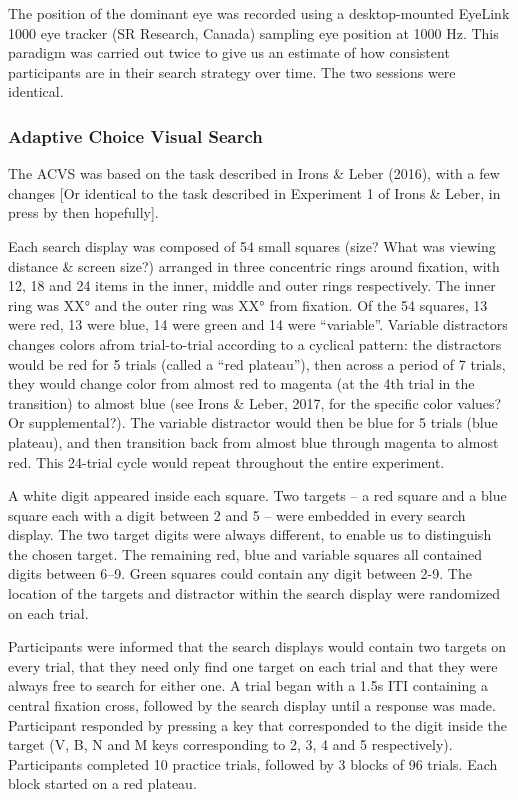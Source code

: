 \documentclass[]{rsos}%
\begin{document}
The position of the dominant eye was recorded using a desktop-mounted EyeLink 1000 eye
tracker (SR Research, Canada) sampling eye position at 1000 Hz.
This paradigm was carried out twice to give us an estimate of how consistent participants are in their search strategy over time. The two sessions were identical.

\subsubsection{Adaptive Choice Visual Search}

The ACVS was based on the task described in Irons & Leber (2016), with a few changes [Or identical to the task described in Experiment 1 of Irons & Leber, in press by then hopefully].

Each search display was composed of 54 small squares (size? What was viewing distance & screen size?) arranged in three concentric rings around fixation, with 12, 18 and 24 items in the inner, middle and outer rings respectively. The inner ring was XX° and the outer ring was XX° from fixation. Of the 54 squares, 13 were red, 13 were blue, 14 were green and 14 were “variable”. Variable distractors changes colors afrom trial-to-trial according to a cyclical pattern: the distractors would be red for 5 trials (called a “red plateau”), then across a period of 7 trials, they would change color from almost red to magenta (at the 4th trial in the transition) to almost blue (see Irons & Leber, 2017, for the specific color values? Or supplemental?). The variable distractor would then be blue for 5 trials (blue plateau), and then transition back from almost blue through magenta to almost red. This 24-trial cycle would repeat throughout the entire experiment. 

A white digit appeared inside each square. Two targets – a red square and a blue square each with a digit between 2 and 5 – were embedded in every search display. The two target digits were always different, to enable us to distinguish the chosen target. The remaining red, blue and variable squares all contained digits between 6–9. Green squares could contain any digit between 2-9. The location of the targets and distractor within the search display were randomized on each trial.

Participants were informed that the search displays would contain two targets on every trial, that they need only find one target on each trial and that they were always free to search for either one. A trial began with a 1.5s ITI containing a central fixation cross, followed by the search display until a response was made. Participant responded by pressing a key that corresponded to the digit inside the target (V, B, N and M keys corresponding to 2, 3, 4 and 5 respectively). Participants completed 10 practice trials, followed by 3 blocks of 96 trials. Each block started on a red plateau.  
\end{document}
